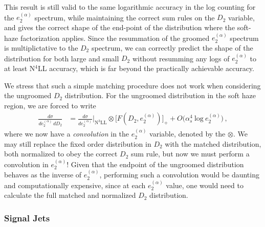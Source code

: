 \documentclass[a4paper,11pt]{article}
\newcommand{\ecf}[2]{e_{#1}^{(#2)}}
\def\log{\text{log}}
\begin{document}
This result is still valid to the same logarithmic accuracy in the log counting for the $\ecf{2}{\alpha}$ spectrum, while maintaining the correct sum rules on the $D_2$ variable, and gives the correct shape of the end-point of the distribution where the soft-haze factorization applies. Since the resummation of the groomed $\ecf{2}{\alpha}$ spectrum is multiplictative to the $D_2$ spectrum, we can correctly predict the shape of the distribution for both large and small $D_2$ without resumming any logs of $\ecf{2}{\alpha}$ to at least N$^4$LL accuracy, which is far beyond the practically achievable accuracy.

We stress that such a simple matching procedure does not work when considering the ungroomed $D_2$ distribution. For the ungroomed distribution in the soft haze region, we are forced to write
\begin{align}\label{eq:fixed_order_d2_with_ecf2_resum_no_grooming}
\frac{d\sigma}{d\ecf{2}{\alpha}\,dD_2}&=\frac{d\sigma}{d\ecf{2}{\alpha}}\Bigg|_{\text{N}^3\text{LL}}\otimes\big[F(D_2,\ecf{2}{\alpha})\big]_++O\Big(\alpha_s^4~\log~\ecf{2}{\alpha}\Big)\,,
\end{align}
where we now have a \emph{convolution} in the $\ecf{2}{\alpha}$ variable, denoted by the $\otimes$. We may still replace the fixed order distribution in $D_2$ with the matched distribution, both normalized to obey the correct $D_2$ sum rule, but now we must perform a convolution in $\ecf{2}{\alpha}$! Given that the endpoint of the ungroomed distribution behaves as the inverse of $\ecf{2}{\alpha}$, performing such a convolution would be daunting and computationally expensive, since at each $\ecf{2}{\alpha}$ value, one would need to calculate the full matched and normalized $D_2$ distribution.

\subsubsection{Signal Jets}\label{sec:fact_sig}
\end{document}
